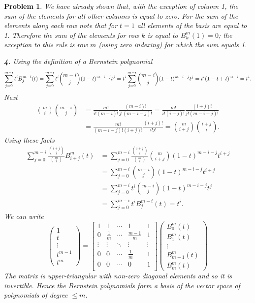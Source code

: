 \documentclass{article}
\newcommand{\subno}[1]{\par\noindent\textbf{#1}}
\theoremstyle{pprop}
\newtheorem{problem}{Problem}[section]
\begin{document}
\begin{problem}
We have already shown that, with the exception of column 1, the sum of the elements for all other columns is equal to zero. 
For the sum of the elements along each row note that for $t=1$ all elements of the basis are equal to 1. Therefore the sum of 
the elements for row $k$ is equal to $B_k^m(1)=0$; the exception to this rule is row $m$ (using zero indexing) for which the sum equals 1.
\subno{4.} Using the definition of a Bernstein polynomial
$$
\sum_{j=0}^{m-i} t^i B_j^{m-i}(t)=\sum_{j=0}^{m-i} t^i \binom{m-i}{j}
(1-t)^{m-i-j} t^j=\\ t^i\sum_{j=0}^{m-i}  \binom{m-i}{j}
(1-t)^{m-i-j} t^j=t^i (1-t+t)^{m-i}=t^i.
$$ 
Next
\begin{align*}
\binom{m}{i}\binom{m-i}{j} & =\frac{m!}{i!(m-i)!}\frac{(m-i)!}{j!(m-i-j)!}  =
\frac{m!}{i!(i+j)!}\frac{(i+j)!}{j!(m-i-j)!} \\
&=\frac{m!}{(m-i-j)!(i+j)!}\frac{(i+j)!}{i!j!}=
\binom{m}{i+j}\binom{i+j}{i}.
\end{align*}
Using these facts
\begin{align*}
\sum_{j=0}^{m-i} \frac{\binom{i+j}{i}}{\binom{m}{i}} B_{i+j}^m (t) & =
\sum_{j=0}^{m-i} \frac{\binom{i+j}{i}}{\binom{m}{i}} \binom{m}{i+j}
(1-t)^{m-i-j} t^{i+j} \\
 & =
\sum_{j=0}^{m-i}  \binom{m-i}{j}
(1-t)^{m-i-j} t^{i+j} \\
& =
\sum_{j=0}^{m-i} t^i \binom{m-i}{j}
(1-t)^{m-i-j} t^{j} \\
& =
\sum_{j=0}^{m-i} t^i B_j^{m-i}(t)=t^i.
\end{align*}
We can write
$$
\begin{pmatrix}
1 \\ t \\ \vdots \\ t^{m-1}  \\ t^m
\end{pmatrix}=
\begin{bmatrix}
1 & 1 & \cdots & 1 & 1 \\
0 & \frac{1}{m} & \cdots & \frac{m-1}{m} & 1 \\
\vdots & \vdots & \ddots & \vdots & \vdots \\
0 & 0 & \cdots & \frac{1}{m} & 1\\
0 & 0 & \cdots & 0 & 1\\
\end{bmatrix}
\begin{pmatrix}
B_0^m(t) \\ B_1^m(t) \\ \vdots \\ B_{m-1}^m(t) \\ B_{m}^m(t)
\end{pmatrix}
$$
The matrix is upper-triangular with non-zero diagonal elements and so it is invertible. Hence the Bernstein polynomials form a 
basis of the vector space of polynomials of degree $\leq m$.


\end{problem}
\end{document}
